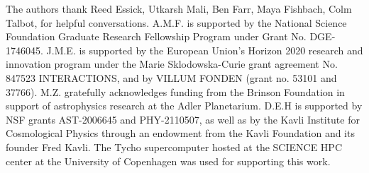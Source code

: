 \documentclass[preprint2,linenumbers]{aastex631}
\begin{document}
\begin{acknowledgments}
    The authors thank Reed Essick, Utkarsh Mali, Ben Farr, Maya Fishbach, Colm Talbot,  for helpful conversations. 
    A.M.F. is supported by the National Science Foundation Graduate Research Fellowship Program under Grant No. DGE-1746045.
    J.M.E. is supported by the European Union’s Horizon 2020 research and innovation program under the Marie Sklodowska-Curie grant agreement No. 847523 INTERACTIONS, and by VILLUM FONDEN (grant no. 53101 and 37766). 
    M.Z. gratefully acknowledges funding from the Brinson Foundation in support of astrophysics research at the Adler Planetarium.
    D.E.H is supported by NSF grants AST-2006645 and PHY-2110507, as well as by the Kavli Institute for Cosmological Physics through an endowment from the Kavli Foundation and its founder Fred Kavli.
    The Tycho supercomputer hosted at the SCIENCE HPC center at the University of Copenhagen was used for supporting this work.
\end{acknowledgments}



\appendix
\end{document}
